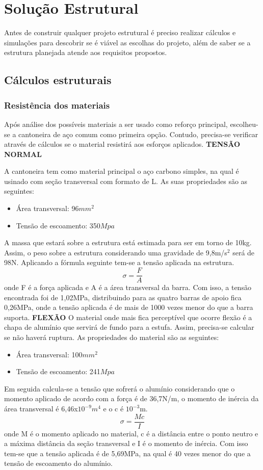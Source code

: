 \section{Solução Estrutural}

Antes de construir qualquer projeto estrutural é preciso realizar cálculos e simulações para descobrir se é viável as escolhas do projeto, além de saber se a estrutura planejada atende aos requisitos propostos.
\subsection{Cálculos estruturais}
\subsubsection{Resistência dos materiais}
Após análise dos possíveis materiais a ser usado como reforço principal, escolheu-se a cantoneira de aço comum como primeira opção. Contudo, precisa-se verificar através de cálculos se o material resistirá aos esforços aplicados.
\noindent \textbf{TENSÃO NORMAL}

A cantoneira tem como material principal o aço carbono simples, na qual é usinado com seção transversal com formato de L. As suas propriedades são as seguintes:
\begin{itemize}
	\item Área transversal: 96$mm^{2}$
	\item Tensão de escoamento: 350$Mpa$
\end{itemize}
A massa que estará sobre a estrutura está estimada para ser em torno de 10kg. Assim, o peso sobre a estrutura considerando uma gravidade de 9,8m/s$^{2}$ será de 98N. Aplicando a fórmula seguinte tem-se a tensão aplicada na estrutura.
\begin{equation}
\sigma = \frac{F}{A}
\end{equation}
onde F é a força aplicada e A é a área transversal da barra. Com isso, a tensão encontrada foi de 1,02MPa, distribuindo para as quatro barras de apoio fica 0,26MPa, onde a tensão aplicada é de mais de 1000 vezes menor do que a barra suporta. 
\noindent \textbf{FLEXÃO}
O material onde mais fica perceptível que ocorre flexão é a chapa de alumínio que servirá de fundo para a estufa. Assim, precisa-se calcular se não haverá ruptura. As propriedades do material são as seguintes:
\begin{itemize}
	\item Área transversal: 100$mm^{2}$
	\item Tensão de escoamento: 241$Mpa$
\end{itemize}
Em seguida calcula-se a tensão que sofrerá o alumínio considerando que o momento aplicado de acordo com a força é de 36,7N/m, o momento de inércia da área transversal é 6,46x$10^{-9} m^4$ e o c é $10^{-3}$m.
\begin{equation}
\sigma = \frac{Mc}{I}
\end{equation}
onde M é o momento aplicado no material, c é a distância entre o ponto neutro e a máxima distância da seção transversal e I é o momento de inércia. Com isso tem-se que a tensão aplicada é de 5,69MPa, na qual é 40 vezes menor do que a tensão de escoamento do alumínio.
